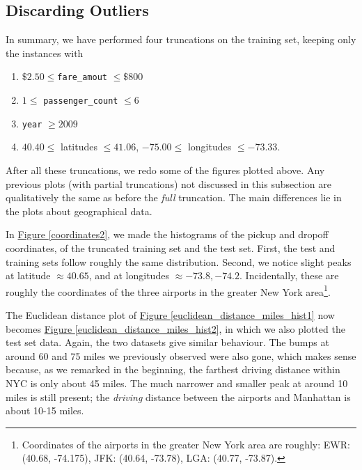 \documentclass[12pt,letterpaper,final]{article}
\numberwithin{equation}{section}
\begin{document}
\subsection{Discarding Outliers}\label{outliersec}

In summary, we have performed four truncations on the training set, keeping only the instances with
\begin{enumerate}
\item $\$2.50\leq $\verb|fare_amout| $\leq \$800$
\item $1\leq $ \verb|passenger_count| $\leq 6$
\item \verb|year| $\geq 2009$
\item $40.40 \leq $ latitudes $\leq 41.06$, $-75.00\leq$ longitudes $\leq -73.33$.
\end{enumerate}

After all these truncations, we redo some of the figures plotted above. Any previous plots (with partial truncations) not discussed in this subsection are qualitatively the same as before the \textit{full} truncation. The main differences lie in the plots about geographical data. 


In \hyperref[coordinates2]{Figure \ref*{coordinates2}}, we made the histograms of the pickup and dropoff coordinates, of the truncated training set and the test set. First, the test and training sets follow roughly the same distribution. Second, we notice slight peaks at latitude $\approx 40.65$, and at longitudes $\approx -73.8, -74.2$. Incidentally, these are roughly the coordinates of the three airports in the greater New York area\footnote{Coordinates of the airports in the greater New York area are roughly: EWR: (40.68, -74.175), JFK: (40.64, -73.78), LGA: (40.77, -73.87).}.


The Euclidean distance plot of \hyperref[euclidean_distance_miles_hist1]{Figure \ref*{euclidean_distance_miles_hist1}} now becomes \hyperref[euclidean_distance_miles_hist2]{Figure \ref*{euclidean_distance_miles_hist2}}, in which we  also plotted the test set data. Again, the  two datasets give similar behaviour. The bumps at around 60 and 75 miles we previously observed were also gone, which makes sense because, as we remarked in the beginning, the farthest driving distance within NYC is only about 45 miles. The much narrower and smaller peak at around 10 miles is still present; the \textit{driving} distance between the airports and Manhattan is about 10-15 miles.
\end{document}
